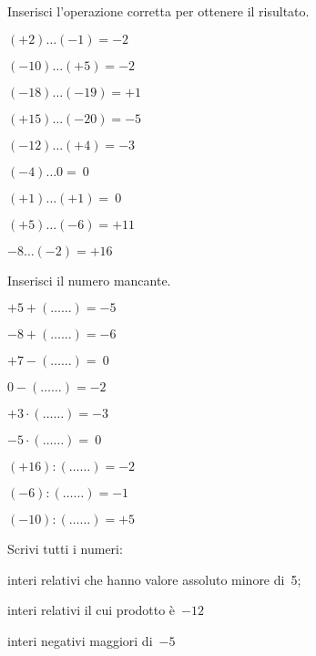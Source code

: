 \begin{esercizio}
Inserisci l'operazione corretta per ottenere il risultato.

\vspace{-.5em}
 \begin{htmulticols}{3}
 \begin{enumeratees}
 \item \((+2)\ldots(-1) = -2\)
 \item \((-10)\ldots(+5) = -2\)
 \item \((-18)\ldots(-19) = +1\)
 \item \((+15)\ldots(-20) = -5\)
 \item \((-12)\ldots(+4) = -3\)
 \item \((-4)\ldots0 =~0\)
 \item \((+1)\ldots(+1) =~0\)
 \item \((+5)\ldots(-6) = +11\)
 \item \(-8\ldots(-2) = +16\)
 \end{enumeratees}
 \end{htmulticols}
\end{esercizio}


\begin{esercizio}
Inserisci il numero mancante.

\vspace{-.5em}
 \begin{htmulticols}{3}
 \begin{enumeratees}
 \item \(+5 + (\ldots\ldots) = -5\)
 \item \(-8 + (\ldots\ldots) = -6\)
 \item \(+7 - (\ldots\ldots) =~0\)
 \item \(0 - (\ldots\ldots) = -2\)
 \item \(+3\cdot (\ldots\ldots) = -3\)
 \item \(-5\cdot (\ldots\ldots) =~0\)
 \item \((+16): (\ldots\ldots) = -2\)
 \item \((-6): (\ldots\ldots) = -1\)
 \item \((-10): (\ldots\ldots) = +5\)
 \end{enumeratees}
 \end{htmulticols}
\end{esercizio}

\begin{esercizio}
 Scrivi tutti i numeri:
 \begin{enumeratees}
 \item interi relativi che hanno valore assoluto minore di~5;
 \item interi relativi il cui prodotto è~\(-12\)
 \item interi negativi maggiori di~\(-5\)
 \end{enumeratees}
\end{esercizio}


